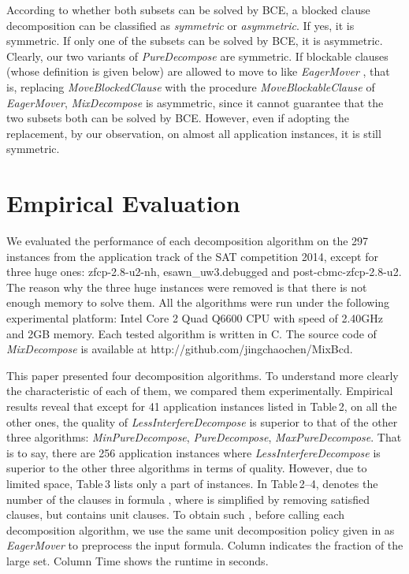 \documentclass{llncs}
\begin{document}
According to whether both subsets can be solved by BCE, a blocked
clause decomposition can be classified as \emph{symmetric} or
\emph{asymmetric}. If yes, it is symmetric. If only one of the
subsets can be solved by BCE, it is asymmetric. Clearly, our two
variants of \emph{PureDecompose} are symmetric. If blockable clauses
(whose definition is given below) are allowed to move to  like
\emph{EagerMover} \cite{EagerMover:14}, that is, replacing
\emph{MoveBlockedClause} with the procedure
\emph{MoveBlockableClause} of \emph{EagerMover},
 \emph{MixDecompose} is asymmetric,
since it cannot guarantee that the two subsets both can be solved by
BCE. However, even if adopting the replacement, by our observation,
on almost all application instances, it is still symmetric.


\section{Empirical Evaluation}

  We evaluated the performance of each decomposition algorithm on the
297 instances from the application track of the SAT competition
2014, except for three huge ones: zfcp-2.8-u2-nh,
esawn\_uw3.debugged and post-cbmc-zfcp-2.8-u2. The reason why the
three huge instances were removed is that there is not enough memory
to solve them. All the algorithms were run under the following
experimental platform: Intel Core 2 Quad Q6600 CPU with speed of
2.40GHz and 2GB memory. Each tested algorithm is written in C. The
source code of \emph{MixDecompose} is available at
http://github.com/jingchaochen/MixBcd.

  This paper presented four decomposition algorithms. To
understand more clearly the characteristic of each of them, we
compared them experimentally. Empirical results reveal that except
for 41 application instances listed in Table\,2, on all the other
ones, the quality of \emph{LessInterfereDecompose} is superior to
that of the other three algorithms: \emph{MinPureDecompose},
\emph{PureDecompose}, \emph{MaxPureDecompose}. That is to say, there
are 256 application instances where \emph{LessInterfereDecompose} is
superior to the other three algorithms in terms of quality. However,
due to limited space, Table\,3 lists only a part of instances. In
Table\,2--4,  denotes the number of the clauses in formula ,
where  is simplified by removing satisfied clauses, but contains
unit clauses. To obtain such , before calling each decomposition
algorithm, we use the same unit decomposition policy given in
\cite{EagerMover:14} as \emph{EagerMover} to preprocess the input
formula. Column  indicates the fraction of the
large set. Column Time shows the runtime in seconds.
\end{document}
